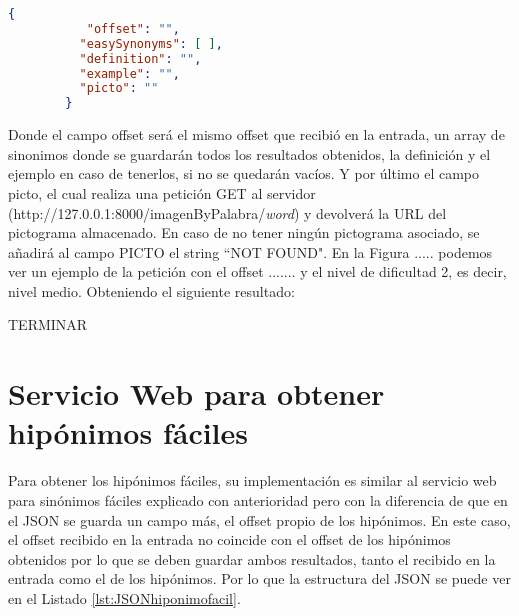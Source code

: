 	
	\begin{lstlisting}[language=json, caption= Estructura JSON para sinónimos fáciles, label={lst:JSONsinonimofacil}, frame=single]
		{ 
		   "offset": "", 
	      "easySynonyms": [ ], 
	      "definition": "", 
	      "example": "", 
	      "picto": ""
	    }
	\end{lstlisting}
	
Donde el campo offset será el mismo offset que recibió en la entrada,  un array de sinonimos donde se guardarán todos los resultados obtenidos, la definición y el ejemplo en caso de tenerlos, si no se quedarán vacíos. Y por último el campo picto, el cual realiza una petición GET al servidor (http://127.0.0.1:8000/imagenByPalabra/\textit{word}) y devolverá la URL del pictograma almacenado. En caso de no tener ningún pictograma asociado, se añadirá al campo PICTO el string ``NOT FOUND".
En la Figura ..... podemos ver un ejemplo de la petición con el offset ....... y el nivel de dificultad 2, es decir, nivel medio. Obteniendo el siguiente resultado:



TERMINAR


\section{Servicio Web  para obtener hipónimos fáciles}
Para obtener los hipónimos fáciles, su implementación es similar al servicio web para sinónimos fáciles explicado con anterioridad pero con la diferencia de que en el JSON se guarda un campo más, el offset propio de los hipónimos.
En este caso, el offset recibido en la entrada no coincide con el offset de los hipónimos obtenidos por lo que se deben guardar ambos resultados, tanto el recibido en la entrada como el de los hipónimos.
Por lo que la estructura del JSON se puede ver en el Listado \ref{lst:JSONhiponimofacil}.






